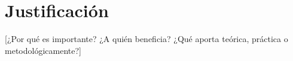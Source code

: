 \section{Justificación}
\label{sec:justificacion}
[¿Por qué es importante? ¿A quién beneficia? ¿Qué aporta teórica, práctica o metodológicamente?]